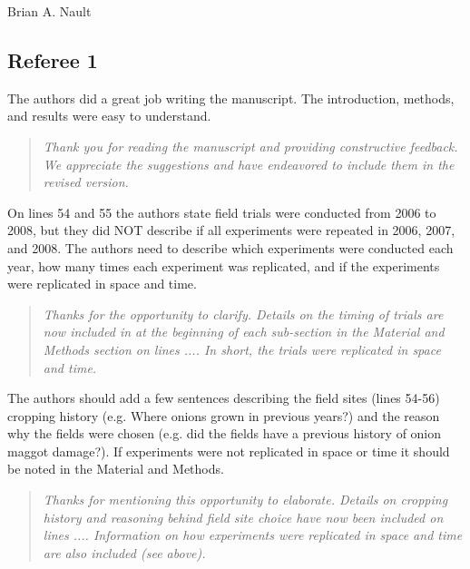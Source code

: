 \documentclass{article}
\begin{document}
Brian A. Nault
\vspace{0.48em} 


\vspace{1.4em}

\hline

\setlength\parindent{0pt}

\subsection*{Referee 1}

The authors did a great job writing the manuscript.  The introduction, methods, and results were easy to understand.    

\begin{quote}
    \textit{Thank you for reading the manuscript and providing constructive feedback.  We appreciate the suggestions and have endeavored to include them in the revised version.  }
\end{quote}

On lines 54 and 55 the authors state field trials were conducted from 2006 to 2008, but they did NOT describe if all experiments were repeated in 2006, 2007, and 2008.  The authors need to describe which experiments were conducted each year, how many times each experiment was replicated, and if the experiments were replicated in space and time.  

\begin{quote}
    \textit{Thanks for the opportunity to clarify.  Details on the timing of trials are now included in at the beginning of each sub-section in the Material and Methods section on lines ....  In short, the trials were replicated in space and time.  }
\end{quote}


The authors should add a few sentences describing the field sites (lines 54-56) cropping history (e.g. Where onions grown in previous years?) and the reason why the fields were chosen (e.g. did the fields have a previous history of onion maggot damage?).  If experiments were not replicated in space or time it should be noted in the Material and Methods. 

\begin{quote}
    \textit{Thanks for mentioning this opportunity to elaborate.  Details on cropping history and reasoning behind field site choice have now been included on lines ....  Information on how experiments were replicated in space and time are also included (see above).  }
\end{quote}
\end{document}
